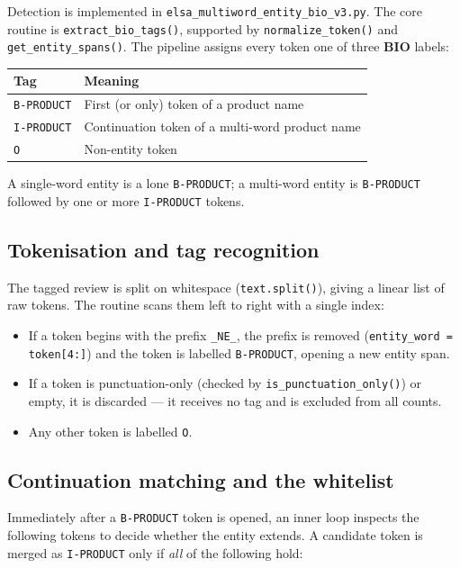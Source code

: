 \documentclass[11pt]{article}
\begin{document}
Detection is implemented in \texttt{elsa\_multiword\_entity\_bio\_v3.py}. The
core routine is \texttt{extract\_bio\_tags()}, supported by
\texttt{normalize\_token()} and \texttt{get\_entity\_spans()}. The pipeline
assigns every token one of three \textbf{BIO} labels:

\begin{center}
\begin{tabular}{@{}ll@{}}
\toprule
\textbf{Tag} & \textbf{Meaning} \\
\midrule
\texttt{B-PRODUCT} & First (or only) token of a product name \\
\texttt{I-PRODUCT} & Continuation token of a multi-word product name \\
\texttt{O}         & Non-entity token \\
\bottomrule
\end{tabular}
\end{center}

\noindent A single-word entity is a lone \texttt{B-PRODUCT}; a multi-word entity
is \texttt{B-PRODUCT} followed by one or more \texttt{I-PRODUCT} tokens.

\subsection{Tokenisation and tag recognition}
The tagged review is split on whitespace (\texttt{text.split()}), giving a linear
list of raw tokens. The routine scans them left to right with a single index:

\begin{itemize}
  \item If a token begins with the prefix \texttt{\_NE\_}, the prefix is removed
        (\texttt{entity\_word = token[4:]}) and the token is labelled
        \texttt{B-PRODUCT}, opening a new entity span.
  \item If a token is punctuation-only (checked by \texttt{is\_punctuation\_only()})
        or empty, it is discarded --- it receives no tag and is excluded from all
        counts.
  \item Any other token is labelled \texttt{O}.
\end{itemize}

\subsection{Continuation matching and the whitelist}
Immediately after a \texttt{B-PRODUCT} token is opened, an inner loop inspects
the following tokens to decide whether the entity extends. A candidate token is
merged as \texttt{I-PRODUCT} only if \emph{all} of the following hold:
\end{document}
